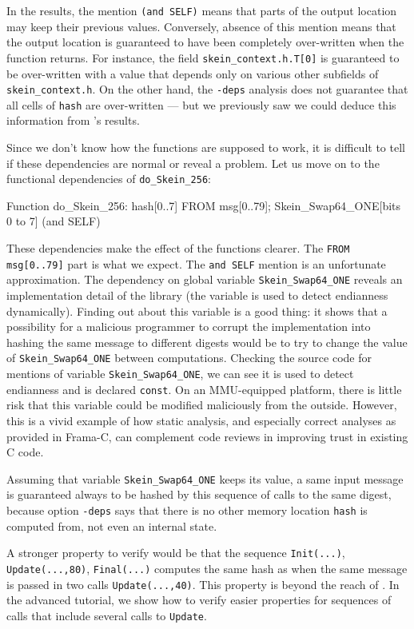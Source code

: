\documentclass{frama-c-book}
\begin{document}
In the results, the mention \verb|(and SELF)| means that parts of the output
location may keep their previous values. Conversely, absence of this
mention means that the output location is guaranteed to have been completely
over-written when the function returns.
For instance, the field \lstinline|skein_context.h.T[0]| is
guaranteed to be over-written with a value that depends only on
various other subfields of \lstinline|skein_context.h|. On the other
hand, the \verb|-deps| analysis does not guarantee that all cells of
\verb|hash| are over-written --- but we previously saw we
could deduce this information from \Eva{}'s results.

Since we don't know how the functions are supposed to work,
it is difficult to tell if these
dependencies are normal or reveal a problem. Let us move on to the
functional dependencies of \lstinline|do_Skein_256|:
\begin{logs}
Function do_Skein_256:
  hash[0..7] FROM msg[0..79]; Skein_Swap64_ONE[bits 0 to 7] (and SELF)
\end{logs}

These dependencies make the effect of the functions clearer.  The
\verb|FROM msg[0..79]| part is what we expect.  The
\verb|and SELF| mention is an unfortunate approximation.  The
dependency on global variable \verb|Skein_Swap64_ONE| reveals an implementation
detail of the library (the variable is used to detect endianness
dynamically). Finding out about this variable is a good thing: it
shows that a possibility for a malicious programmer to corrupt the
implementation into hashing the same message to different digests
would be to try to change the value of \verb|Skein_Swap64_ONE| between
computations.  Checking the source code for mentions of variable
\lstinline|Skein_Swap64_ONE|, we can see it is used to
detect endianness and is declared \lstinline|const|. On an
MMU-equipped platform, there is little risk that this variable
could be modified maliciously from the outside.
However, this is a vivid example of how static
analysis, and especially correct analyses as provided in Frama-C, can
complement code reviews in improving trust in existing C code.

Assuming that variable \lstinline|Skein_Swap64_ONE| keeps its value, a same
input message is guaranteed always to be hashed by this
sequence of calls to the same digest,
because option \verb|-deps| says that there is no other
memory location \lstinline|hash| is computed from, not even an
internal state.

A stronger property to verify would be that the
sequence \lstinline|Init(...)|, \lstinline|Update(...,80)|,
\lstinline|Final(...)| computes the same hash as when the
same message is passed in two calls \lstinline|Update(...,40)|.
This property is beyond the reach of \Eva{}.
In the advanced tutorial, we show how to verify easier properties
for sequences of calls that include several calls
to \lstinline|Update|.
\end{document}

